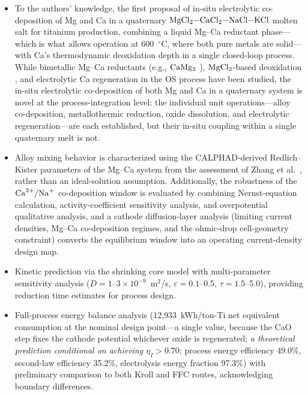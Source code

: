 \documentclass[pdflatex,sn-basic,Numbered]{sn-jnl}
\begin{document}
\begin{itemize}
\item To the authors' knowledge, the first proposal of in-situ electrolytic co-deposition of Mg and Ca in a quaternary $\ce{MgCl2-CaCl2-NaCl-KCl}$ molten salt for titanium production, combining a liquid Mg--Ca reductant phase---which is what allows operation at 600~$^{\circ}$C, where both pure metals are solid---with Ca's thermodynamic deoxidation depth in a single closed-loop process. While bimetallic Mg--Ca reductants (e.g., $\ce{CaMg2}$ \cite{lee2025}), $\ce{MgCl2}$-based deoxidation \cite{taninouchi2016}, and electrolytic Ca regeneration in the OS process \cite{ono2002} have been studied, the in-situ electrolytic co-deposition of both Mg and Ca in a quaternary system is novel at the process-integration level: the individual unit operations---alloy co-deposition, metallothermic reduction, oxide dissolution, and electrolytic regeneration---are each established, but their in-situ coupling within a single quaternary melt is not.
\item Alloy mixing behavior is characterized using the CALPHAD-derived Redlich--Kister parameters of the Mg--Ca system from the assessment of Zhang et al.\ \cite{zhang2008mgce}, rather than an ideal-solution assumption. Additionally, the robustness of the $\ce{Ca^{2+}/Na+}$ co-deposition window is evaluated by combining Nernst-equation calculation, activity-coefficient sensitivity analysis, and overpotential qualitative analysis, and a cathode diffusion-layer analysis (limiting current densities, Mg--Ca co-deposition regimes, and the ohmic-drop cell-geometry constraint) converts the equilibrium window into an operating current-density design map.
\item Kinetic prediction via the shrinking core model with multi-parameter sensitivity analysis ($D = 1$--$3\times10^{-9}$~m$^2$/s, $\varepsilon = 0.1$--0.5, $\tau = 1.5$--5.0), providing reduction time estimates for process design.
\item Full-process energy balance analysis (12{,}933~kWh/ton-Ti net equivalent consumption at the nominal design point---a single value, because the CaO step fixes the cathode potential whichever oxide is regenerated; \emph{a theoretical prediction conditional on achieving $\eta_I > 0.70$}; process energy efficiency 49.0\%, second-law efficiency 35.2\%, electrolysis energy fraction 97.3\%) with preliminary comparison to both Kroll and FFC routes, acknowledging boundary differences.
\end{itemize}
\end{document}
